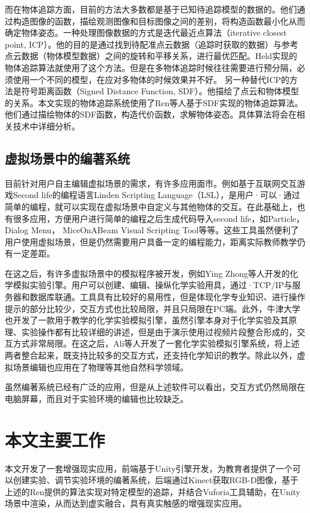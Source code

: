 而在物体追踪方面，目前的方法大多数都是基于已知待追踪模型的数据的。他们通过构造图像的函数，描绘观测图像和目标图像之间的差别，将构造函数最小化从而确定物体姿态。一种处理图像数据的方式是迭代最近点算法（iterative closest point, ICP）。他的目的是通过找到待配准点云数据（追踪时获取的数据）与参考点云数据（物体模型数据）之间的旋转和平移关系，进行最优匹配。Held实现的物体追踪算法就使用了这个方法。\cite{held20123d}但是在多物体追踪时候往往需要进行预分隔，必须使用一个不同的模型，在应对多物体的时候效果并不好。
另一种替代ICP的方法是符号距离函数（Signed Distance Function, SDF）。他描绘了点云和物体模型的关系。本文实现的物体追踪系统使用了Ren等人基于SDF实现的物体追踪算法。\cite{ren2017real}他们通过描绘物体的SDF函数，构造代价函数，求解物体姿态。具体算法将会在相关技术中详细分析。

\subsection{虚拟场景中的编著系统}
目前针对用户自主编辑虚拟场景的需求，有许多应用面市。例如基于互联网交互游戏Second life的编程语言Linden Scripting Language（LSL），是用户·可以·通过简单的编程，就可以实现在虚拟场景中自定义与其他物体的交互。\cite{LSLTutorial}在此基础上，也有很多应用，方便用户进行简单的编程之后生成代码导入second life，如Particle，Dialog Menu， MiceOnABeam Visual Scripting Tool等等。\cite{zhong2014domain}这些工具虽然便利了用户使用虚拟场景，但是仍然需要用户具备一定的编程能力，距离实际教师教学仍有一定差距。

在这之后，有许多虚拟场景中的模拟程序被开发，例如Ying Zhong等人开发的化学模拟实验引擎。\cite{zhong2014domain}用户可以创建、编辑、操纵化学实验用具，通过·TCP/IP与服务器和数据库联通。工具具有比较好的易用性，但是体现化学专业知识、进行操作提示的部分比较少，交互方式也比较局限，并且只局限在PC端。此外，牛津大学也开发了一款用于教学的化学实验模拟引擎，虽然引擎本身对于化学实验及其原理、实验操作都有比较详细的讲述，但是由于演示使用过视频片段整合形成的，交互方式非常局限。\cite{OxfordChe}在这之后，Ali等人开发了一套化学实验模拟引擎系统，\cite{ali2014effect}将上述两者整合起来，既支持比较多的交互方式，还支持化学知识的教学。除此以外，虚拟场景编辑也应用在了物理等其他自然科学领域。\cite{daineko2017using}

虽然编著系统已经有广泛的应用，但是从上述软件可以看出，交互方式仍然局限在电脑屏幕，而且对于实验环境的编辑也比较缺乏。

\section{本文主要工作}
本文开发了一套增强现实应用，前端基于Unity引擎开发，为教育者提供了一个可以创建实验、调节实验环境的编著系统，后端通过Kinect获取RGB-D图像，基于上述的Ren提供的算法\cite{ren2017real}实现对特定模型的追踪，并结合Vuforia工具辅助，在Unity场景中渲染，从而达到虚实融合，具有真实触感的增强现实应用。


